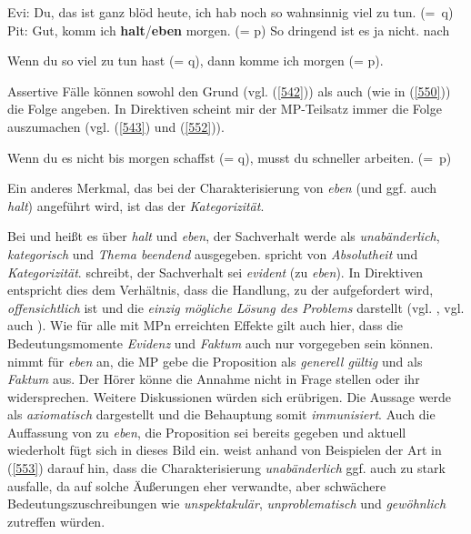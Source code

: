 \begin{exe}
	\ex\label{550} 
	Evi: Du, das ist ganz blöd heute, ich hab noch so wahnsinnig viel zu tun. 
	\newline
	\hbox{}\hfill\hbox{(= q)}\\
	Pit: Gut, komm ich \textbf{halt}/\textbf{eben} morgen. (= p) So dringend ist es ja nicht.
	\newline
	\hbox{}\hfill\hbox{nach \citet[122]{Thurmair1989}} 	
\end{exe}

\begin{exe}
	\ex\label{551} 
	\glq Wenn du so viel zu tun hast (= q), dann komme ich morgen (= p).\grq {} 	
\end{exe}
Assertive Fälle können sowohl den Grund (vgl. (\ref{542})) als auch (wie in (\ref{550})) die Folge angeben. In Direktiven scheint mir der MP-Teilsatz immer die Folge auszumachen (vgl. (\ref{543}) und (\ref{552})).

\begin{exe}
	\ex\label{552} 
	Wenn du es nicht bis morgen schaffst (= q), musst du schneller arbeiten. 
	\newline
	\hbox{}\hfill\hbox{(= p)} 	
\end{exe}
Ein anderes Merkmal, das bei der Charakterisierung von \textit{eben} (und ggf. auch \textit{halt}) angeführt wird, ist das der \textit{Kategorizität}. 

Bei \citet[120-121]{Helbig1990} und \citet[340]{Karagjosova2003} heißt es über \textit{halt} und \textit{eben}, der Sachverhalt werde als \textit{unabänderlich}, \textit{kategorisch} und \textit{Thema beendend} ausgegeben. \citet[80/83]{Autenrieth2002} spricht von \textit{Absolutheit} und \textit{Kategorizität}. \citet[120]{Thurmair1989} schreibt, der Sachverhalt sei \textit{evident} (zu \textit{eben}). In Direktiven entspricht dies dem Verhältnis, dass die Handlung, zu der aufgefordert wird, \textit{offensichtlich} ist und die \textit{einzig mögliche Lösung des Problems} darstellt (vgl. \citealt[122]{Thurmair1989}, vgl. auch \citealt[169]{Hentschel1986}). Wie für alle mit MPn erreichten Effekte gilt auch hier, dass die Bedeutungsmomente \textit{Evidenz} und \textit{Faktum} auch nur vorgegeben sein können. \citet[320-323]{Troemel-Ploetz1979} nimmt für \textit{eben} an, die MP gebe die Proposition als \textit{generell gültig} und als \textit{Faktum} aus. Der Hörer könne die Annahme nicht in Frage stellen oder ihr widersprechen. Weitere Diskussionen würden sich erübrigen. Die Aussage werde als \textit{axiomatisch} dargestellt und die Behauptung somit \textit{immunisiert}. Auch die Auffassung von \citet[130]{Diewald1997} zu \textit{eben}, die Proposition sei \glqq bereits gegeben und aktuell wiederholt\grqq{} fügt sich in dieses Bild ein. \citet{Autenrieth2002} weist anhand von Beispielen der Art in (\ref{553}) darauf hin, dass die Charakterisierung \textit{unabänderlich} ggf. auch zu stark ausfalle, da auf solche Äußerungen eher verwandte, aber schwächere Bedeutungs\-zuschreibungen wie \textit{unspektakulär}, \textit{unproblematisch} und \textit{gewöhnlich} zutreffen würden.

